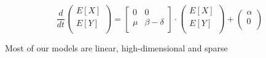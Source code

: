 \documentclass{beamer}
\begin{document}
\begin{frame}
    \begin{equation*}
        \frac{d}{dt} 
        \begin{pmatrix}
            E[X] \\
            E[Y] \\
        \end{pmatrix}
        = 
        \begin{bmatrix}
            0 & 0 \\
            \mu & \beta - \delta \\
        \end{bmatrix}
        \cdot
        \begin{pmatrix}
            E[X] \\
            E[Y] \\
        \end{pmatrix}
        +
        \begin{pmatrix}
            \alpha \\
            0 \\
        \end{pmatrix}
    \end{equation*}

\begin{center}
    \small{Most of our models are linear, high-dimensional and sparse\footnotemark}
\end{center}
\end{frame}


\end{document}
